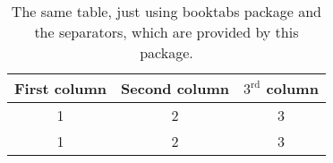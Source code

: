 \begin{table}[h]
    \centering
    \begin{tabular}{ccc}
        \toprule
        First column & Second column & $\mathrm{3^{rd}}$ column
        \tabularnewline\midrule
        1 & 2 & 3
        \tabularnewline
        1 & 2 & 3
        \tabularnewline\bottomrule
    \end{tabular}
    \caption{The same table, just using booktabs package and the
        separators, which are provided by this package.}
    \label{tab:table2}
\end{table}
